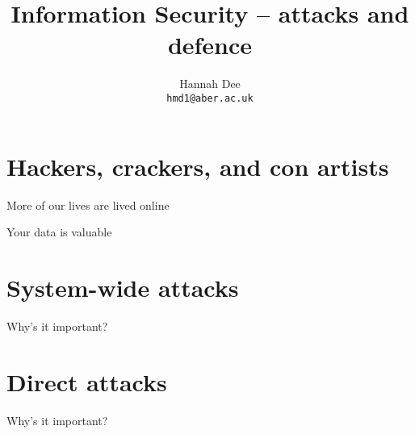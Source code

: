 \documentclass[xcolor=table]{beamer}
\title{Information Security -- attacks and defence}
\author[hmd1]{Hannah Dee \\
  \texttt{hmd1@aber.ac.uk}}
\date{}
\institute[]{U3A Aberystwyth, April 2023\\
  Aberystwyth University, Department of Computer Science}
\begin{document}
\begin{frame}
  \titlepage
\end{frame}


\section{Hackers, crackers, and con artists}

\begin{frame}{More of our lives are lived online}
\end{frame}

\begin{frame}{Your data is valuable}
\end{frame}

\section{System-wide attacks}

\begin{frame}{Why's it important?}

\end{frame}

\section{Direct attacks}

\begin{frame}{Why's it important?}

\end{frame}
\end{document}
